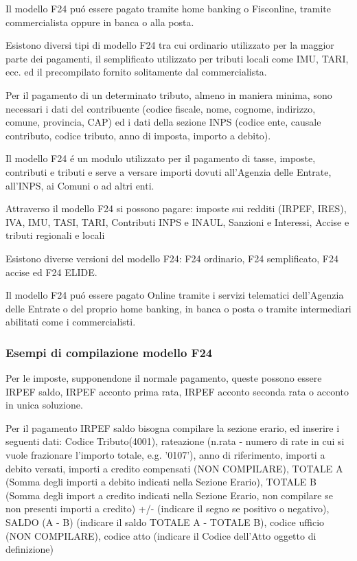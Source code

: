 \documentclass{article}
\begin{document}
Il modello F24 pu\'o essere pagato tramite home banking o Fisconline, tramite commercialista oppure in banca o alla posta.

Esistono diversi tipi di modello F24 tra cui ordinario utilizzato per la maggior parte dei pagamenti, il semplificato utilizzato per tributi locali come IMU, TARI, ecc. ed il precompilato fornito solitamente dal commercialista.

Per il pagamento di un determinato tributo, almeno in maniera minima, sono necessari i dati del contribuente (codice fiscale, nome, cognome, indirizzo, comune, provincia, CAP) 
ed i dati della sezione INPS (codice ente, causale contributo, codice tributo, anno di imposta, importo a debito).   

Il modello F24 \'e un modulo utilizzato per il pagamento di tasse, imposte, contributi e tributi e serve a versare importi dovuti all'Agenzia delle Entrate, all'INPS, ai Comuni o ad altri enti. 

Attraverso il modello F24 si possono pagare: imposte sui redditi (IRPEF, IRES), IVA, IMU, TASI, TARI, Contributi INPS e INAUL, Sanzioni e Interessi, Accise e tributi regionali e locali

Esistono diverse versioni del modello F24: F24 ordinario, F24 semplificato, F24 accise ed F24 ELIDE.

Il modello F24 pu\'o essere pagato Online tramite i servizi telematici dell'Agenzia delle Entrate o del proprio home banking, in banca o posta o tramite intermediari abilitati come i commercialisti.


\subsubsection{Esempi di compilazione modello F24}
Per le imposte, supponendone il normale pagamento,
queste possono essere IRPEF saldo, IRPEF acconto prima rata, IRPEF acconto seconda rata o acconto in unica soluzione.

Per il pagamento IRPEF saldo bisogna compilare la sezione erario, ed inserire i seguenti dati: 
Codice Tributo(4001), 
rateazione (n.rata - numero di rate in cui si vuole frazionare l'importo totale, e.g. '0107'), 
anno di riferimento, 
importi a debito versati, 
importi a credito compensati (NON COMPILARE),
TOTALE A (Somma degli importi a debito indicati nella Sezione Erario),
TOTALE B (Somma degli import a credito indicati nella Sezione Erario, non compilare se non presenti importi a credito)
+/- (indicare il segno se positivo o negativo),
SALDO (A - B) (indicare il saldo TOTALE A - TOTALE B),
codice ufficio (NON COMPILARE),
codice atto (indicare il Codice dell'Atto oggetto di definizione)
\end{document}
